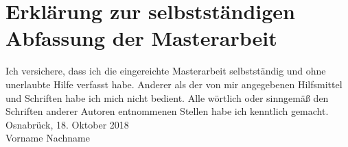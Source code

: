 \chapter*{Erklärung zur selbstständigen Abfassung der Masterarbeit}

Ich versichere, dass ich die eingereichte Masterarbeit selbstständig und ohne unerlaubte Hilfe verfasst habe. Anderer als der von mir angegebenen Hilfsmittel und Schriften habe ich mich nicht bedient. Alle wörtlich oder sinngemäß den Schriften anderer Autoren entnommenen Stellen habe ich kenntlich gemacht. \\


\bigskip
\bigskip
\bigskip
\bigskip
\noindent
Osnabrück, 18. Oktober 2018 \\

\bigskip
\bigskip
\bigskip
\bigskip
\noindent
Vorname Nachname